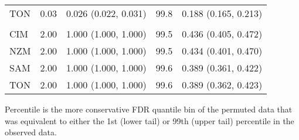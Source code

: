 \documentclass[twoside,openright]{report}
\begin{document}
\begin{table}
\begin{threeparttable}
\begin{tabular}[t]{lrlrl}
\hspace{1em}TON & 0.03 & 0.026 (0.022, 0.031) & 99.8 & 0.188 (0.165, 0.213)\\
\addlinespace[0.3em]
\multicolumn{5}{l}{\textbf{Zeng's E}}\\
\hspace{1em}CIM & 2.00 & 1.000 (1.000, 1.000) & 99.5 & 0.436 (0.405, 0.472)\\
\hspace{1em}NZM & 2.00 & 1.000 (1.000, 1.000) & 99.5 & 0.434 (0.401, 0.470)\\
\hspace{1em}SAM & 2.00 & 1.000 (1.000, 1.000) & 99.6 & 0.389 (0.361, 0.422)\\
\hspace{1em}TON & 2.00 & 1.000 (1.000, 1.000) & 99.6 & 0.389 (0.362, 0.423)\\
\bottomrule
\end{tabular}
\begin{tablenotes}
\item Percentile is the more conservative FDR quantile bin of the permuted data that was equivalent to either the 1st (lower tail) or 99th (upper tail) percentile in the observed data.
\end{tablenotes}
\end{threeparttable}
\end{table}
\end{document}
